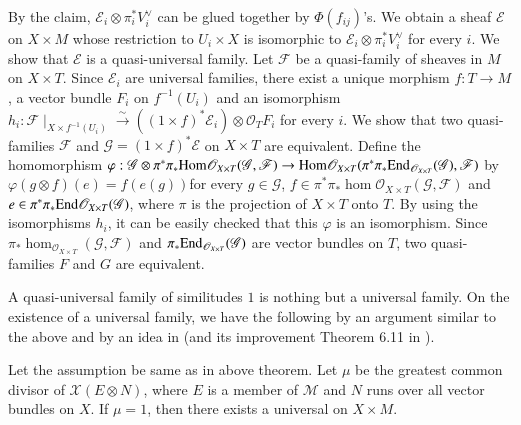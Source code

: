 \begin{Proof}
By the claim, $\mathscr{E}_i\otimes \pi^{\ast}_{i}V^{\vee}_i$ can be
glued together by $\Phi(f_{ij})$'s. We obtain a sheaf $\mathscr{E}$ on
$X\times M$ whose restriction to $U_i\times X$ is isomorphic to
$\mathscr{E}_i\otimes \pi^{\ast}_iV^{\vee}_i$ for every $i$. We show
that $\mathscr{E}$ is a quasi-universal family. Let $\mathscr{F}$ be a
quasi-family of sheaves in $M$ on $X\times T$. Since $\mathscr{E}_i$
are universal families, there exist a unique morphism $f:T\to M$, a
vector bundle $F_i$ on $f^{-1}(U_i)$ and an isomorphism
$h_i:\mathscr{F}\mid_{X\times f^{-1}(U_i)}\xrightarrow{\sim}((1\times
f)^{\ast}\mathscr{E}_i)\otimes \mathscr{O}_T F_i$ for every $i$. We
show that two quasi-families $\mathscr{F}$ and $\mathscr{G}=(1\times
f)^{\ast}\mathscr{E}$ on $X\times T$ are equivalent. Define the
homomorphism
$\varphi:\mathscr{G}\otimes\pi^{\ast}\pi_{\ast}\mathrm{Hom}\mathscr{O}_{X\times
T}(\mathscr{G},\mathscr{F})\to \mathrm{Hom}\mathscr{O}_{X\times
T}(\pi^{\ast}\pi_{\ast}\mathrm{End}_{\mathscr{O}_{X\times
T}}(\mathscr{G}),\mathscr{F})$ by $\varphi(g\otimes f)(e)=f(e(g))$\pageoriginale for
every $g\in \mathscr{G}$,
$f\in \pi^{\ast}\pi_{\ast}\hom\mathscr{O}_{X\times
T}(\mathscr{G},\mathscr{F})$ and
$e\in \pi^{\ast}\pi_{\ast}\mathrm{End}\mathscr{O}_{X\times T}(\mathscr{G})$,
where $\pi$ is the projection of $X\times T$ onto $T$. By using the
isomorphisms $h_i$, it can be easily checked that this $\varphi$ is an
isomorphism. Since $\pi_{\ast}\hom_{\mathscr{O}_{X\times T}}
(\mathscr{G},\mathscr{F})$ and $\pi_{\ast}\mathrm{End}_{\mathscr{O}_{X\times
T}}(\mathscr{G})$ are vector bundles on $T$, two quasi-families $F$
and $G$ are equivalent.
\enprf
\end{Proof}

A quasi-universal family of similitudes $1$ is nothing but a universal
family. On the existence of a universal family, we have the following
by an argument similar to the above and by an idea in \cite{key16}
(and its improvement Theorem 6.11 in \cite{key9}).

\begin{Thm}\label{Thm6}
Let the assumption be same as in above theorem. Let $\mu$ be the
greatest common divisor of $\mathcal{X}(E\otimes N)$, where $E$ is a
member of $\mathscr{M}$ and $N$ runs over all vector bundles on
$X$. If $\mu=1$, then there exists a universal on $X\times M$. 
\end{Thm}

